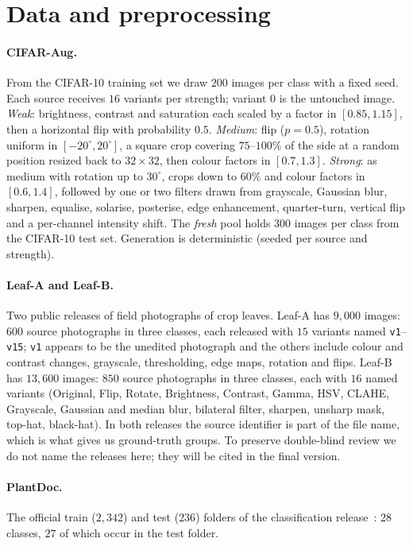\section{Data and preprocessing}
\label{app:data}

\paragraph{CIFAR-Aug.} From the CIFAR-10 training set we draw $200$ images per class with a fixed seed. Each source receives $16$ variants per strength; variant $0$ is the untouched image. \emph{Weak}: brightness, contrast and saturation each scaled by a factor in $[0.85,1.15]$, then a horizontal flip with probability $0.5$. \emph{Medium}: flip ($p=0.5$), rotation uniform in $[-20^\circ,20^\circ]$, a square crop covering $75$--$100\%$ of the side at a random position resized back to $32\times32$, then colour factors in $[0.7,1.3]$. \emph{Strong}: as medium with rotation up to $30^\circ$, crops down to $60\%$ and colour factors in $[0.6,1.4]$, followed by one or two filters drawn from grayscale, Gaussian blur, sharpen, equalise, solarise, posterise, edge enhancement, quarter-turn, vertical flip and a per-channel intensity shift. The \emph{fresh} pool holds $300$ images per class from the CIFAR-10 test set. Generation is deterministic (seeded per source and strength).

\paragraph{Leaf-A and Leaf-B.} Two public releases of field photographs of crop leaves. Leaf-A has $9{,}000$ images: $600$ source photographs in three classes, each released with $15$ variants named \texttt{v1}--\texttt{v15}; \texttt{v1} appears to be the unedited photograph and the others include colour and contrast changes, grayscale, thresholding, edge maps, rotation and flips. Leaf-B has $13{,}600$ images: $850$ source photographs in three classes, each with $16$ named variants (Original, Flip, Rotate, Brightness, Contrast, Gamma, HSV, CLAHE, Grayscale, Gaussian and median blur, bilateral filter, sharpen, unsharp mask, top-hat, black-hat). In both releases the source identifier is part of the file name, which is what gives us ground-truth groups. To preserve double-blind review we do not name the releases here; they will be cited in the final version.

\paragraph{PlantDoc.} The official train ($2{,}342$) and test ($236$) folders of the classification release~\citep{singh2020plantdoc}: $28$ classes, $27$ of which occur in the test folder.

